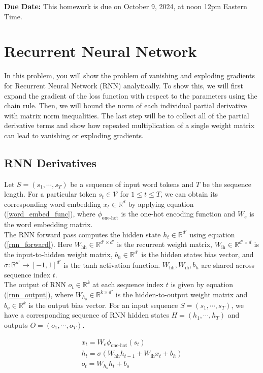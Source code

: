 \documentclass{article}
\theoremstyle{case}
\theoremstyle{definition}
\begin{document}
\textbf{Due Date:} This homework is due on October 9, 2024, at noon 12pm Eastern Time.  


\section{Recurrent Neural Network}
In this problem, you will show the problem of vanishing and exploding gradients for Recurrent Neural Network (RNN) analytically. To show this, we will first expand the gradient of the loss function with respect to the parameters using the chain rule. Then, we will bound the norm of each individual partial derivative with matrix norm inequalities. The last step will be to collect all of the partial derivative terms and show how repeated multiplication of a single weight matrix can lead to vanishing or exploding gradients. 

\subsection{RNN Derivatives}

Let $S=(s_1,\cdots,s_T)$ be a sequence of input word tokens and $T$ be the sequence length. For a particular token $s_t\in \mathcal{V}$ for $1\leq t\leq T$, we can obtain its corresponding word embedding $x_t\in\mathbb{R}^{d}$ by applying equation (\ref{word_embed_func}), where $\phi_{\text{one-hot}}$ is the one-hot encoding function and $W_e$ is the word embedding matrix. \\

The RNN forward pass computes the hidden state $h_t\in\mathbb{R}^{d'}$ using equation (\ref{rnn_forward}). Here $W_{\text{hh}}\in\mathbb{R}^{d'\times d'}$ is the recurrent weight matrix,  $W_{\text{ih}}\in\mathbb{R}^{d'\times d}$ is the input-to-hidden weight matrix, $b_h\in\mathbb{R}^{d'}$ is the hidden states bias vector, and $\sigma:\mathbb{R}^{d'}\to[-1,1]^{d'}$ is the tanh activation function. $W_{\text{hh}},W_{\text{ih}},b_h$ are shared across sequence index $t$.\\

The output of RNN $o_t\in\mathbb{R}^{k}$ at each sequence index $t$ is given by equation (\ref{rnn_output}), where $W_{h_o}\in\mathbb{R}^{k\times d'}$ is the hidden-to-output weight matrix and $b_o\in\mathbb{R}^{k}$ is the output bias vector. For an input sequence $S=(s_1,\cdots,s_T)$, we have a corresponding sequence of RNN hidden states  $H=(h_1,\cdots,h_T)$ and outputs $O=(o_1,\cdots,o_T)$.

\begin{align}
    x_t=W_e\phi_{\text{one-hot}}(s_t)\label{word_embed_func}\\
    h_t=\sigma(W_{\text{hh}}h_{t-1}+W_{\text{ih}}x_t+b_h)\label{rnn_forward}\\
    o_t=W_{h_o}h_t+b_o\label{rnn_output}
\end{align}
\end{document}
